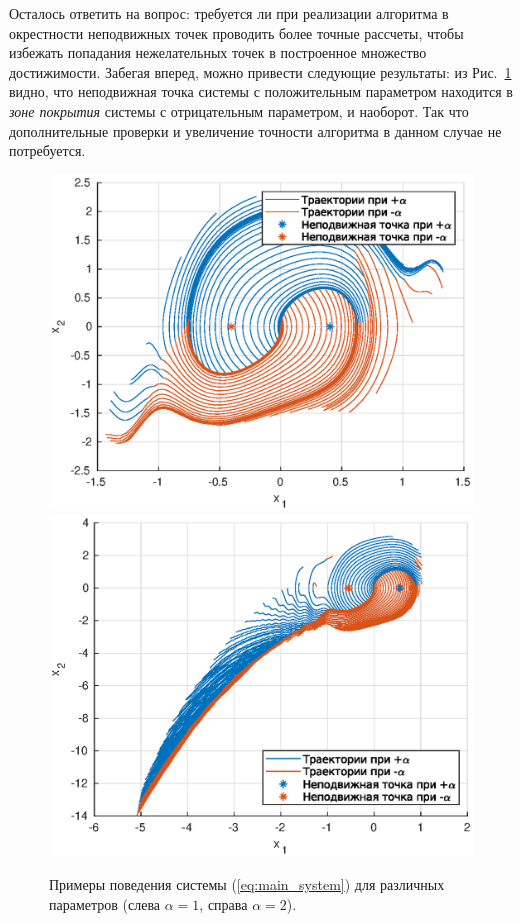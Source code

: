 Осталось ответить на вопрос: требуется ли при реализации алгоритма в окрестности неподвижных точек проводить более точные рассчеты, чтобы избежать попадания нежелательных точек в построенное множество достижимости. Забегая вперед, можно привести следующие результаты: из Рис.~\ref{img:fixed_points_2} видно, что 
неподвижная точка системы с положительным параметром находится в \textit{зоне покрытия} системы с отрицательным параметром, и наоборот. Так что дополнительные проверки и увеличение точности алгоритма в данном случае не потребуется.

\begin{figure}[h]
        \centering
        \includegraphics[width=0.49\linewidth]{research_of_the_system/fixed_points/a1t3.eps}
        \includegraphics[width=0.49\linewidth]{research_of_the_system/fixed_points/a2t2.eps}
        \caption{Примеры поведения системы (\ref{eq:main_system}) для различных параметров (слева $\alpha = 1$, справа $\alpha = 2$).}
        \label{img:fixed_points_2}
\end{figure}